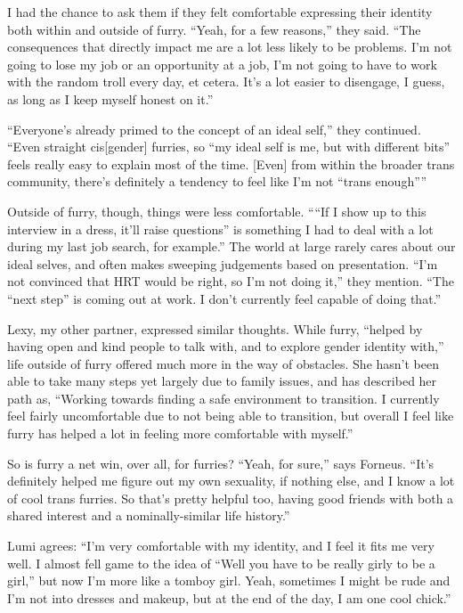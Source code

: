 I had the chance to ask them if they felt comfortable expressing their identity both within and outside of furry. ``Yeah, for a few reasons,'' they said. ``The consequences that directly impact me are a lot less likely to be problems. I'm not going to lose my job or an opportunity at a job, I'm not going to have to work with the random troll every day, et cetera. It's a lot easier to disengage, I guess, as long as I keep myself honest on it.''

``Everyone's already primed to the concept of an ideal self,'' they continued. ``Even straight cis[gender] furries, so ``my ideal self is me, but with different bits'' feels really easy to explain most of the time.
[Even] from within the broader trans community, there's definitely a tendency to feel like I'm not ``trans enough''''

Outside of furry, though, things were less comfortable. ````If I show up to this interview in a dress, it'll raise questions'' is something I had to deal with a lot during my last job search, for example.''  The world at large rarely cares about our ideal selves, and often makes sweeping judgements based on presentation. ``I'm not convinced that HRT would be right, so I'm not doing it,'' they mention. ``The ``next step'' is coming out at work. I don't currently feel capable of doing that.''

Lexy, my other partner, expressed similar thoughts. While furry, ``helped by having open and kind people to talk with, and to explore gender identity with,'' life outside of furry offered much more in the way of obstacles. She hasn't been able to take many steps yet largely due to family issues, and has described her path as, ``Working towards finding a safe environment to transition. I currently feel fairly uncomfortable due to not being able to transition, but overall I feel like furry has helped a lot in feeling more comfortable with myself.''

So is furry a net win, over all, for furries? ``Yeah, for sure,'' says Forneus. ``It's definitely helped me figure out my own sexuality, if nothing else, and I know a lot of cool trans furries. So that's pretty helpful too, having good friends with both a shared interest and a nominally-similar life history.''

Lumi agrees: ``I'm very comfortable with my identity, and I feel it fits me very well. I almost fell game to the idea of ``Well you have to be really girly to be a girl,'' but now I'm more like a tomboy girl. Yeah, sometimes I might be rude and I'm not into dresses and makeup, but at the end of the day, I am one cool chick.''

